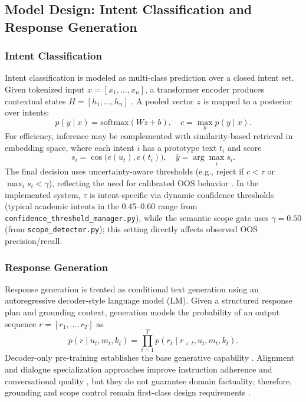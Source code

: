 \documentclass[12pt,onecolumn]{report}
\begin{document}
\subsection{Model Design: Intent Classification and Response Generation}
\subsubsection{Intent Classification}
Intent classification is modeled as multi-class prediction over a closed intent set. Given tokenized input $x=[x_1,\ldots,x_n]$, a transformer encoder produces contextual states $H=[h_1,\ldots,h_n]$ \cite{vaswani2017attention,devlin2019bert}. A pooled vector $z$ is mapped to a posterior over intents:
\[
p(y\mid x)=\mathrm{softmax}(Wz+b),\quad c=\max_y p(y\mid x).
\]
For efficiency, inference may be complemented with similarity-based retrieval in embedding space, where each intent $i$ has a prototype text $t_i$ and score
\[
s_i=\cos\bigl(e(u_t),e(t_i)\bigr),\quad \hat{y}=\arg\max_i s_i.
\]
The final decision uses uncertainty-aware thresholds (e.g., reject if $c<\tau$ or $\max_i s_i<\gamma$), reflecting the need for calibrated OOS behavior \cite{larson2019clinc150,casanueva2020banking77,zhang2020fewshot}. In the implemented system, $\tau$ is intent-specific via dynamic confidence thresholds (typical academic intents in the 0.45--0.60 range from \texttt{confidence\_threshold\_manager.py}), while the semantic scope gate uses $\gamma=0.50$ (from \texttt{scope\_detector.py}); this setting directly affects observed OOS precision/recall.

\subsubsection{Response Generation}
Response generation is treated as conditional text generation using an autoregressive decoder-style language model (LM). Given a structured response plan and grounding context, generation models the probability of an output sequence $r=[r_1,\ldots,r_T]$ as
\[
p(r\mid u_t,m_t,k_t)=\prod_{t=1}^T p(r_t\mid r_{<t},u_t,m_t,k_t).
\]
Decoder-only pre-training establishes the base generative capability \cite{radford2018gpt,radford2019gpt2,brown2020fewshot}. Alignment and dialogue specialization approaches improve instruction adherence and conversational quality \cite{ouyang2022rlhf,thoppilan2022lamda,openai2022chatgpt}, but they do not guarantee domain factuality; therefore, grounding and scope control remain first-class design requirements \cite{roller2021recipes,khatri2018alexa}.
\end{document}
